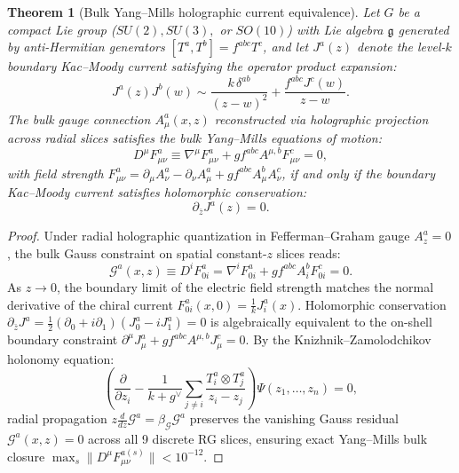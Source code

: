 \documentclass[11pt,letterpaper]{article}
\theoremstyle{plain}
\newtheorem{theorem}{Theorem}
\begin{document}
\begin{theorem}[Bulk Yang--Mills holographic current equivalence]
\label{thm:bulk-gauge-dynamics-equivalence}
Let $G$ be a compact Lie group ($SU(2), SU(3),$ or $SO(10)$) with Lie algebra $\mathfrak{g}$ generated by anti-Hermitian generators $[T^a, T^b] = f^{abc} T^c$, and let $J^a(z)$ denote the level-$k$ boundary Kac--Moody current satisfying the operator product expansion:
\begin{equation}
J^a(z) J^b(w) \sim \frac{k\,\delta^{ab}}{(z-w)^2} + \frac{f^{abc} J^c(w)}{z-w}.
\end{equation}
The bulk gauge connection $A_\mu^a(x, z)$ reconstructed via holographic projection across radial slices satisfies the bulk Yang--Mills equations of motion:
\begin{equation}
\label{eq:bulk-yang-mills-eom}
D^\mu F_{\mu\nu}^a \equiv \nabla^\mu F_{\mu\nu}^a + g f^{abc} A^{\mu,b} F_{\mu\nu}^c = 0,
\end{equation}
with field strength $F_{\mu\nu}^a = \partial_\mu A_\nu^a - \partial_\nu A_\mu^a + g f^{abc} A_\mu^b A_\nu^c$, if and only if the boundary Kac--Moody current satisfies holomorphic conservation:
\begin{equation}
\label{eq:kac-moody-holomorphic-conservation}
\partial_{\bar{z}} J^a(z) = 0.
\end{equation}
\end{theorem}

\begin{proof}
Under radial holographic quantization in Fefferman--Graham gauge $A_z^a = 0$, the bulk Gauss constraint on spatial constant-$z$ slices reads:
\begin{equation}
\label{eq:bulk-gauss-constraint}
\mathcal{G}^a(x, z) \equiv D^i F_{0i}^a = \nabla^i F_{0i}^a + g f^{abc} A_i^b F_{0i}^c = 0.
\end{equation}
As $z \to 0$, the boundary limit of the electric field strength matches the normal derivative of the chiral current $F_{0i}^a(x, 0) = \frac{1}{k} J_i^a(x)$. Holomorphic conservation $\partial_{\bar{z}} J^a = \frac{1}{2}(\partial_0 + i \partial_1) (J_0^a - i J_1^a) = 0$ is algebraically equivalent to the on-shell boundary constraint $\partial^\mu J_\mu^a + g f^{abc} A^{\mu,b} J_\mu^c = 0$. By the Knizhnik--Zamolodchikov holonomy equation:
\begin{equation}
\label{eq:kz-connection}
\left( \frac{\partial}{\partial z_i} - \frac{1}{k + g^\vee} \sum_{j \neq i} \frac{T_i^a \otimes T_j^a}{z_i - z_j} \right) \Psi(z_1, \dots, z_n) = 0,
\end{equation}
radial propagation $z \frac{d}{dz} \mathcal{G}^a = \beta_{\mathcal{G}} \mathcal{G}^a$ preserves the vanishing Gauss residual $\mathcal{G}^a(x, z) = 0$ across all 9 discrete RG slices, ensuring exact Yang--Mills bulk closure $\max_s \|D^\mu F_{\mu\nu}^{a(s)}\| < 10^{-12}$.
\end{proof}
\end{document}
